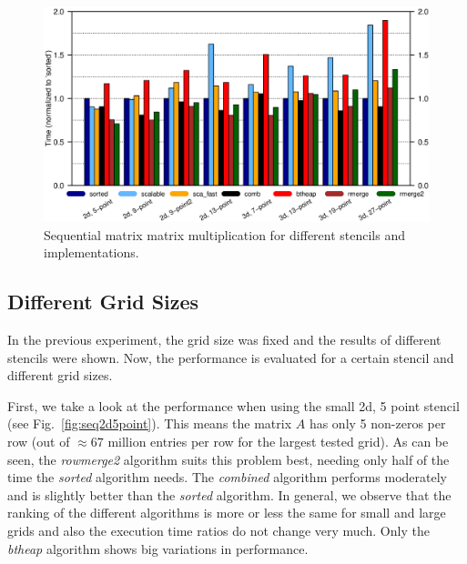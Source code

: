 

\begin{figure}[tb]
	\centering
	\hspace*{-10mm}\includegraphics[width=1.1\textwidth, trim={0 7.cm 0 1.6cm},clip]{petsc-matmatmult}
	\caption{Sequential matrix matrix multiplication for different stencils and implementations.  } 
	\label{fig:ex209_R}
\end{figure}

\subsection{Different Grid Sizes}

In the previous experiment, the grid size was fixed and the results of different stencils were shown. Now, the performance is evaluated for a certain stencil and different grid sizes. 

First, we take a look at the performance when using the small 2d, 5 point stencil (see Fig.~\ref{fig:seq2d5point}). This means the matrix $A$ has only 5 non-zeros per row (out of $\approx 67$ million entries per row for the largest tested grid). As can be seen, the \textit{rowmerge2} algorithm suits this problem best, needing only half of the time the \textit{sorted} algorithm needs. The \textit{combined} algorithm performs moderately and is slightly better than the \textit{sorted} algorithm. In general, we observe that the ranking of the different algorithms is more or less the same for small and large grids and also the execution time ratios do not change very much. Only the \textit{btheap} algorithm shows big variations in performance.

